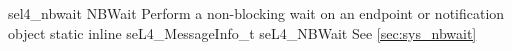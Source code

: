 %
%
%
%

\apidoc
{sel4_nbwait}
{NBWait}
{Perform a non-blocking wait on an endpoint or notification object}
{static inline seL4\_MessageInfo\_t seL4\_NBWait}
{
}
{\messageinforetdesc}
{See \autoref{sec:sys_nbwait}}
